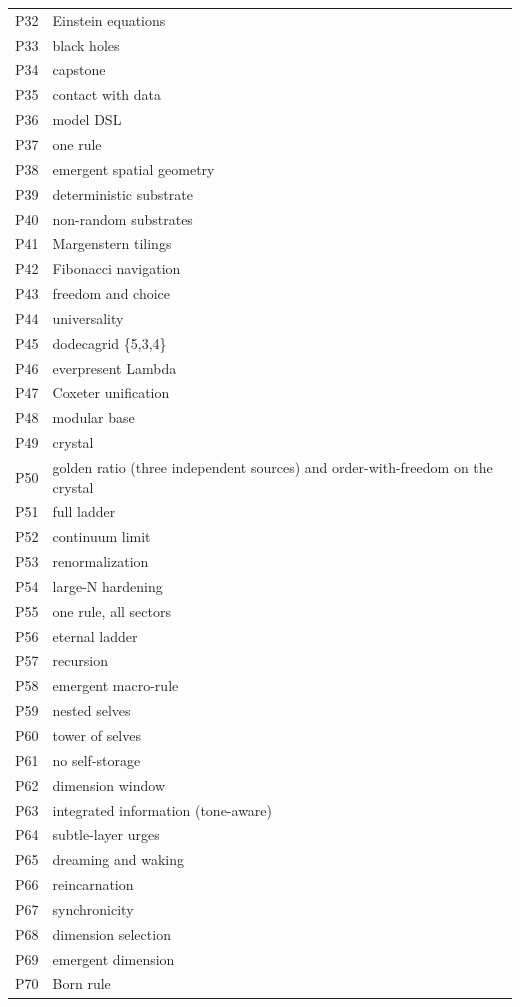 \begin{small}
\begin{longtable}{p{0.7cm}p{13.5cm}}
P32 & Einstein equations \\
P33 & black holes \\
P34 & capstone \\
P35 & contact with data \\
P36 & model DSL \\
P37 & one rule \\
P38 & emergent spatial geometry \\
P39 & deterministic substrate \\
P40 & non-random substrates \\
P41 & Margenstern tilings \\
P42 & Fibonacci navigation \\
P43 & freedom and choice \\
P44 & universality \\
P45 & dodecagrid \{5,3,4\} \\
P46 & everpresent Lambda \\
P47 & Coxeter unification \\
P48 & modular base \\
P49 & crystal \\
P50 & golden ratio (three independent sources) and order-with-freedom on the crystal \\
P51 & full ladder \\
P52 & continuum limit \\
P53 & renormalization \\
P54 & large-N hardening \\
P55 & one rule, all sectors \\
P56 & eternal ladder \\
P57 & recursion \\
P58 & emergent macro-rule \\
P59 & nested selves \\
P60 & tower of selves \\
P61 & no self-storage \\
P62 & dimension window \\
P63 & integrated information (tone-aware) \\
P64 & subtle-layer urges \\
P65 & dreaming and waking \\
P66 & reincarnation \\
P67 & synchronicity \\
P68 & dimension selection \\
P69 & emergent dimension \\
P70 & Born rule \\

\end{longtable}
\end{small}
